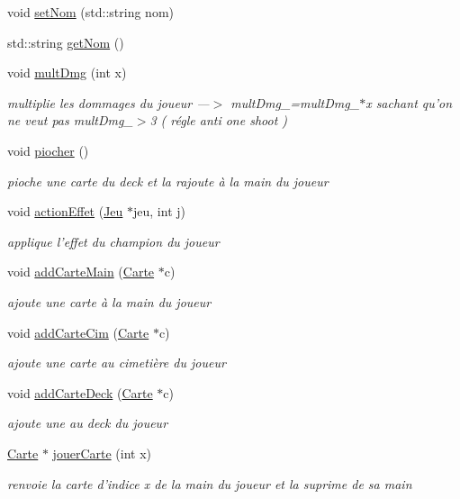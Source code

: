 \begin{DoxyCompactItemize}
\item 
void \hyperlink{class_joueur_af32faed0cf3db6f3dd613d9d5b5aff9a}{set\-Nom} (std\-::string nom)
\item 
std\-::string \hyperlink{class_joueur_a5ba8036208a35efd6bf37a86b36063b0}{get\-Nom} ()
\item 
void \hyperlink{class_joueur_a1ed6a04dae56ba4db8550a1c4d9a8e5a}{mult\-Dmg} (int x)
\begin{DoxyCompactList}\small\item\em multiplie les dommages du joueur ---$>$ mult\-Dmg\-\_\-=mult\-Dmg\-\_\-$\ast$x sachant qu'on ne veut pas mult\-Dmg\-\_\-$>$3 ( régle anti one shoot ) \end{DoxyCompactList}\item 
void \hyperlink{class_joueur_a881fbda6f6be97214aaed647cda9522b}{piocher} ()
\begin{DoxyCompactList}\small\item\em pioche une carte du deck et la rajoute à la main du joueur \end{DoxyCompactList}\item 
void \hyperlink{class_joueur_a74a07a6ac4976f0ad898cb607f7e8ae1}{action\-Effet} (\hyperlink{class_jeu}{Jeu} $\ast$jeu, int j)
\begin{DoxyCompactList}\small\item\em applique l'effet du champion du joueur \end{DoxyCompactList}\item 
void \hyperlink{class_joueur_a8e5d808b7d59f05e9be7f335564f73f6}{add\-Carte\-Main} (\hyperlink{class_carte}{Carte} $\ast$c)
\begin{DoxyCompactList}\small\item\em ajoute une carte à la main du joueur \end{DoxyCompactList}\item 
void \hyperlink{class_joueur_a9da8663575f4d42504b6d09a6f7611a5}{add\-Carte\-Cim} (\hyperlink{class_carte}{Carte} $\ast$c)
\begin{DoxyCompactList}\small\item\em ajoute une carte au cimetière du joueur \end{DoxyCompactList}\item 
void \hyperlink{class_joueur_a0fff3f0ae27db0703a28616b79b7d50c}{add\-Carte\-Deck} (\hyperlink{class_carte}{Carte} $\ast$c)
\begin{DoxyCompactList}\small\item\em ajoute une au deck du joueur \end{DoxyCompactList}\item 
\hyperlink{class_carte}{Carte} $\ast$ \hyperlink{class_joueur_a1bbc084069be942f09c86eebfd4490b8}{jouer\-Carte} (int x)
\begin{DoxyCompactList}\small\item\em renvoie la carte d'indice x de la main du joueur et la suprime de sa main \end{DoxyCompactList}\end{DoxyCompactItemize}


